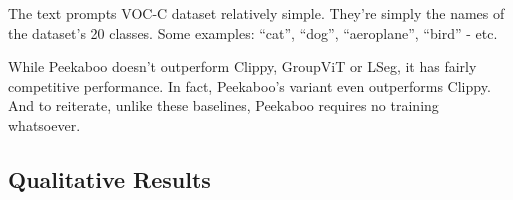 The text prompts VOC-C dataset relatively simple. They're simply the names of the dataset's 20 classes. Some examples: ``cat'', ``dog'', ``aeroplane'', ``bird'' - etc. 

While Peekaboo doesn't outperform Clippy, GroupViT or LSeg, it has fairly competitive performance. In fact, Peekaboo's  variant even outperforms Clippy. And to reiterate, unlike these baselines, Peekaboo requires no training whatsoever.


\subsection{Qualitative Results}




